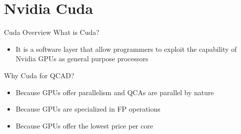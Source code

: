 \documentclass[10pt, red]{beamer}
\begin{document}
\section{Nvidia Cuda}

	\begin{frame}{Cuda Overview}
		What is Cuda?		
		\begin{itemize}
			\item It is a software layer that allow programmers to exploit the capability of Nvidia GPUs as general purpose processors
		\end{itemize}
		Why Cuda for QCAD?
		\begin{itemize}
			\item Because GPUs offer parallelism and QCAs are parallel by nature
			\item Because GPUs are specialized in FP operations
			\item Because GPUs offer the lowest price per core
		\end{itemize}
	\end{frame}
\end{document}
